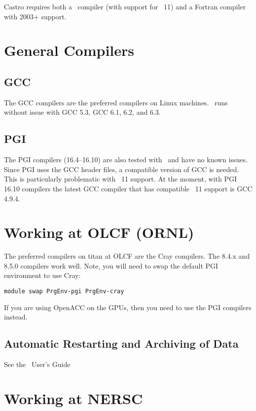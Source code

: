Castro requires both a \cpp\ compiler (with support for \cpp\ 11) and
a Fortran compiler with 2003+ support.

\section{General Compilers}

\subsection{GCC}
The GCC compilers are the preferred compilers on Linux machines.
\castro\ runs without issue with GCC 5.3, GCC 6.1, 6.2, and 6.3.

\subsection{PGI}

The PGI compilers (16.4--16.10) are also tested with \castro\ and have
no known issues.  Since PGI uses the GCC header files, a compatible
version of GCC is needed.  This is particularly problematic with \cpp~11
support.  At the moment, with PGI 16.10 compilers the latest GCC compiler
that has compatible \cpp~11 support is GCC 4.9.4.

\section{Working at OLCF (ORNL)}

The preferred compilers on titan at OLCF are the Cray compilers.  The
8.4.x and 8.5.0 compilers work well.  Note, you will need to swap
the default PGI environment to use Cray:
\begin{verbatim}
module swap PrgEnv-pgi PrgEnv-cray
\end{verbatim}

If you are using OpenACC on the GPUs, then you need to use the PGI
compilers instead.



\subsection{Automatic Restarting and Archiving of Data}

See the \maestro\ User's Guide


\section{Working at NERSC}

